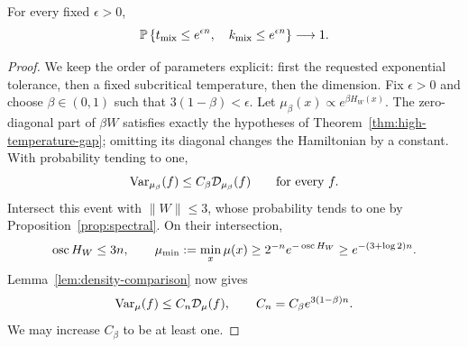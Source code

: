 \begin{proposition}
\label{prop:subexponential-upper}
For every fixed $\epsilon>0$,
\[
 \mathbb P\left\{t_{\mathrm{mix}}\le e^{\epsilon n},\quad
                 k_{\mathrm{mix}}\le e^{\epsilon n}\right\}
 \longrightarrow1.
\]
\end{proposition}

\begin{proof}
We keep the order of parameters explicit: first the requested
exponential tolerance, then a fixed subcritical temperature, then the
dimension. Fix $\epsilon>0$ and choose $\beta\in(0,1)$ such that
$3(1-\beta)<\epsilon$.  Let
$\mu_\beta(x)\propto e^{\beta H_W(x)}$.
The zero-diagonal part of $\beta W$ satisfies exactly the hypotheses of
Theorem~\ref{thm:high-temperature-gap}; omitting its diagonal changes
the Hamiltonian by a constant.  With probability tending to one,
\[
 \operatorname{Var}_{\mu_\beta}(f)\le C_\beta\mathcal D_{\mu_\beta}(f)
 \qquad\text{for every }f.
\]
Intersect this event with $\|W\|\le3$, whose probability tends to one
by Proposition~\ref{prop:spectral}.  On their intersection,
\[
 \operatorname{osc} H_W\le3n,
 \qquad
 \mu_{\min}:=\min_x\mu(x)
 \ge2^{-n}e^{-\operatorname{osc} H_W}\ge e^{-(3+\log2)n}.
\]
Lemma~\ref{lem:density-comparison} now gives
\begin{equation}\label{eq:critical-poincare-upper}
 \operatorname{Var}_\mu(f)\le C_n\mathcal D_\mu(f),
 \qquad C_n=C_\beta e^{3(1-\beta)n}.
\end{equation}
We may increase $C_\beta$ to be at least one.


\end{proof}
